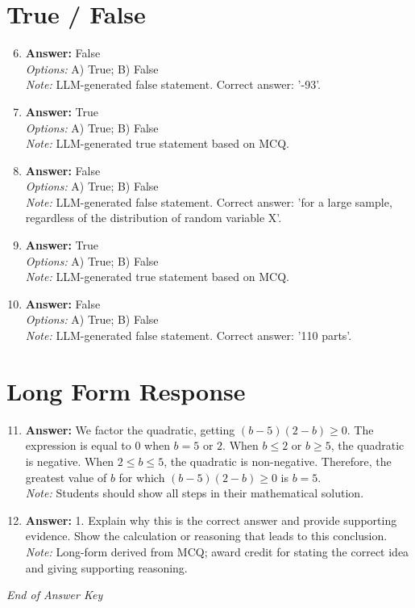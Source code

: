 \documentclass[12pt]{article}
\begin{document}
\section*{True / False}
\begin{enumerate}[label=\arabic*.]
\setcounter{enumi}{5}
\item \textbf{Answer:} False
\\ \textit{Options:} A) True; B) False
\\ \textit{Note:} LLM-generated false statement. Correct answer: '-93'.
\item \textbf{Answer:} True
\\ \textit{Options:} A) True; B) False
\\ \textit{Note:} LLM-generated true statement based on MCQ.
\item \textbf{Answer:} False
\\ \textit{Options:} A) True; B) False
\\ \textit{Note:} LLM-generated false statement. Correct answer: 'for a large sample, regardless of the distribution of random variable X'.
\item \textbf{Answer:} True
\\ \textit{Options:} A) True; B) False
\\ \textit{Note:} LLM-generated true statement based on MCQ.
\item \textbf{Answer:} False
\\ \textit{Options:} A) True; B) False
\\ \textit{Note:} LLM-generated false statement. Correct answer: '110 parts'.
\end{enumerate}

\section*{Long Form Response}
\begin{enumerate}[label=\arabic*.]
\setcounter{enumi}{10}
\item \textbf{Answer:} We factor the quadratic, getting $(b-5)(2-b) \ge 0$. The expression is equal to $0$ when $b=5 \text{ or } 2$. When $b \le 2$ or $b \ge 5$, the quadratic is negative. When $2 \le b \le 5$, the quadratic is non-negative. Therefore, the greatest value of $b$ for which $(b-5)(2-b)\ge 0$ is $b=\boxed{5}$.
\\ \textit{Note:} Students should show all steps in their mathematical solution.
\item \textbf{Answer:} 1. Explain why this is the correct answer and provide supporting evidence. Show the calculation or reasoning that leads to this conclusion.
\\ \textit{Note:} Long-form derived from MCQ; award credit for stating the correct idea and giving supporting reasoning.
\end{enumerate}

\vfill
\noindent\textit{End of Answer Key}
\end{document}
